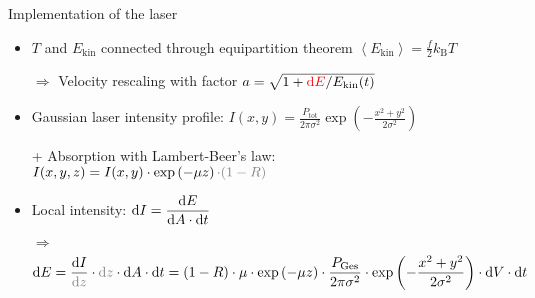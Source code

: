 \begin{frame}{Implementation of the laser}
	\begin{itemize}[<+->]
		\item $T$ and $E_\text{kin}$ connected through equipartition theorem
		$\left\langle E_\text{kin} \right\rangle = \frac{f}{2} k_\text{B} T$
		\item[$\Rightarrow$] Velocity rescaling with factor
		$a = \sqrt{1+  {\color{red} \dx[E]} / E_\text{kin}(t)}$
		\item Gaussian laser intensity profile: $I(x,y) = \frac{P_\text{tot}}{2\pi \sigma^2} \exp\left( -\frac{x^2+y^2}{2\sigma^2} \right)$
		\item[] + Absorption with Lambert-Beer's law: $I(x,y,z) = I(x,y) \cdot \exp\left(-\mu z\right) {\color{gray} \cdot (1-R)}$
		\vspace{0.5cm}
		\item Local intensity: $\dx[I] = \dfrac{\dx[E]}{\dx[A] \cdot \dx[t]}$
		\item[$\Rightarrow$]
		\begin{align}
			\dx[E] = \frac{\dx[I]}{\color{gray} \dx[z]} \cdot {\color{gray} \dx[z]} \cdot \dx[A] \cdot \dx[t]
				= (1-R) \cdot \mu \cdot \exp\left(-\mu z\right)
				\cdot \frac{P_\text{Ges}}{2\pi \sigma^2}
				\cdot \exp\left(-\frac{x^2 + y^2}{2\sigma^2}\right)
				\cdot \dx[V] \cdot \dt
		\end{align}
	\end{itemize}
\end{frame}
